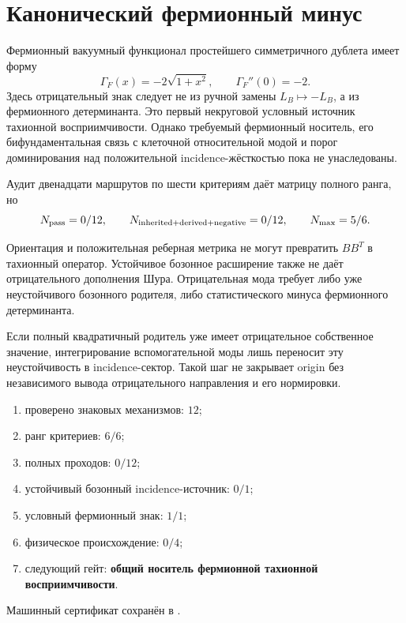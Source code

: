 \section{Канонический фермионный минус}

Фермионный вакуумный функционал простейшего симметричного дублета имеет
форму
\begin{equation}
 \Gamma_F(x)=-2\sqrt{1+x^2},\qquad
 \Gamma_F''(0)=-2.
\end{equation}
Здесь отрицательный знак следует не из ручной замены $L_B\mapsto-L_B$, а
из фермионного детерминанта. Это первый некруговой условный источник
тахионной восприимчивости. Однако требуемый фермионный носитель, его
бифундаментальная связь с клеточной относительной модой и порог
доминирования над положительной incidence-жёсткостью пока не унаследованы.

Аудит двенадцати маршрутов по шести критериям даёт матрицу полного ранга,
но
\begin{equation}
 N_{\rm pass}=0/12,\qquad
 N_{\rm inherited+derived+negative}=0/12,\qquad
 N_{\rm max}=5/6.
\end{equation}

\begin{theorem}
Ориентация и положительная реберная метрика не могут превратить
$BB^T$ в тахионный оператор. Устойчивое бозонное расширение также не даёт
отрицательного дополнения Шура. Отрицательная мода требует либо уже
неустойчивого бозонного родителя, либо статистического минуса фермионного
детерминанта.
\end{theorem}

\begin{nogocriterion}
Если полный квадратичный родитель уже имеет отрицательное собственное
значение, интегрирование вспомогательной моды лишь переносит эту
неустойчивость в incidence-сектор. Такой шаг не закрывает origin без
независимого вывода отрицательного направления и его нормировки.
\end{nogocriterion}

\begin{protocol}\begin{enumerate}
\item проверено знаковых механизмов: \textbf{$12$};
\item ранг критериев: \textbf{$6/6$};
\item полных проходов: \textbf{$0/12$};
\item устойчивый бозонный incidence-источник: \textbf{$0/1$};
\item условный фермионный знак: \textbf{$1/1$};
\item физическое происхождение: \textbf{$0/4$};
\item следующий гейт: \textbf{общий носитель фермионной тахионной восприимчивости}.
\end{enumerate}\end{protocol}

Машинный сертификат сохранён в
.